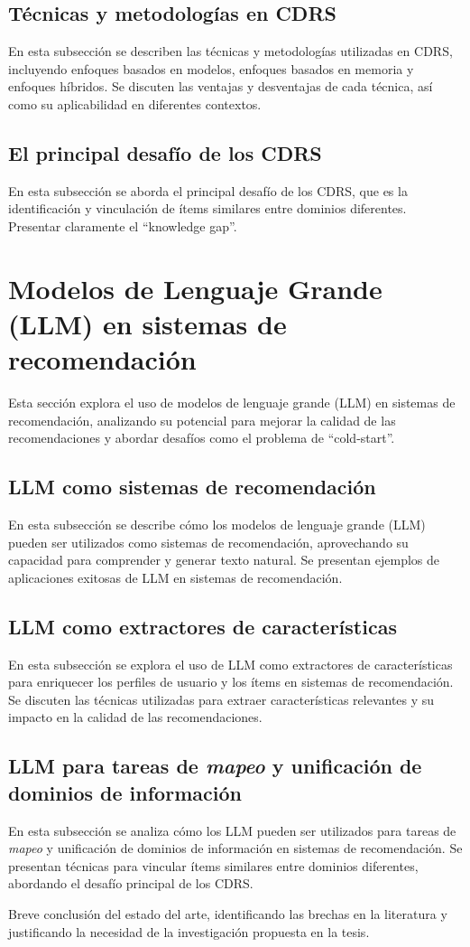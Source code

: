 	\subsection{Técnicas y metodologías en CDRS}
		En esta subsección se describen las técnicas y metodologías utilizadas en CDRS, incluyendo enfoques basados en modelos, enfoques basados en memoria y enfoques híbridos. Se discuten las ventajas y desventajas de cada técnica, así como su aplicabilidad en diferentes contextos.

	\subsection{El principal desafío de los CDRS}
		En esta subsección se aborda el principal desafío de los CDRS, que es la identificación y vinculación de ítems similares entre dominios diferentes. Presentar claramente el \enquote{knowledge gap}.

\section{Modelos de Lenguaje Grande (LLM) en sistemas de recomendación}
	Esta sección explora el uso de modelos de lenguaje grande (LLM) en sistemas de recomendación, analizando su potencial para mejorar la calidad de las recomendaciones y abordar desafíos como el problema de \enquote{cold-start}.

	\subsection{LLM como sistemas de recomendación}
		En esta subsección se describe cómo los modelos de lenguaje grande (LLM) pueden ser utilizados como sistemas de recomendación, aprovechando su capacidad para comprender y generar texto natural. Se presentan ejemplos de aplicaciones exitosas de LLM en sistemas de recomendación.

	\subsection{LLM como extractores de características}
		En esta subsección se explora el uso de LLM como extractores de características para enriquecer los perfiles de usuario y los ítems en sistemas de recomendación. Se discuten las técnicas utilizadas para extraer características relevantes y su impacto en la calidad de las recomendaciones.

	\subsection{LLM para tareas de \textit{mapeo} y unificación de dominios de información}
		En esta subsección se analiza cómo los LLM pueden ser utilizados para tareas de \textit{mapeo} y unificación de dominios de información en sistemas de recomendación. Se presentan técnicas para vincular ítems similares entre dominios diferentes, abordando el desafío principal de los CDRS.

Breve conclusión del estado del arte, identificando las brechas en la literatura y justificando la necesidad de la investigación propuesta en la tesis.